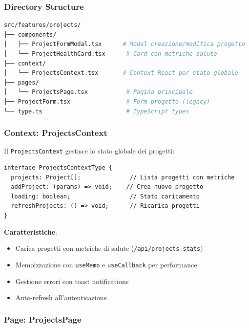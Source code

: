 \documentclass[11pt,a4paper]{article}
\begin{document}
\subsubsection{Directory Structure}

\begin{lstlisting}[language=bash]
src/features/projects/
├── components/
│   ├── ProjectFormModal.tsx      # Modal creazione/modifica progetto
│   └── ProjectHealthCard.tsx      # Card con metriche salute
├── context/
│   └── ProjectsContext.tsx       # Context React per stato globale
├── pages/
│   └── ProjectsPage.tsx           # Pagina principale
├── ProjectForm.tsx                # Form progetto (legacy)
└── type.ts                        # TypeScript types
\end{lstlisting}

\subsubsection{Context: ProjectsContext}

Il \texttt{ProjectsContext} gestisce lo stato globale dei progetti:

\begin{lstlisting}
interface ProjectsContextType {
  projects: Project[];              // Lista progetti con metriche
  addProject: (params) => void;    // Crea nuovo progetto
  loading: boolean;                 // Stato caricamento
  refreshProjects: () => void;      // Ricarica progetti
}
\end{lstlisting}

\textbf{Caratteristiche}:
\begin{itemize}
    \item Carica progetti con metriche di salute (\texttt{/api/projects-stats})
    \item Memoizzazione con \texttt{useMemo} e \texttt{useCallback} per performance
    \item Gestione errori con toast notifications
    \item Auto-refresh all'autenticazione
\end{itemize}

\subsubsection{Page: ProjectsPage}
\end{document}
